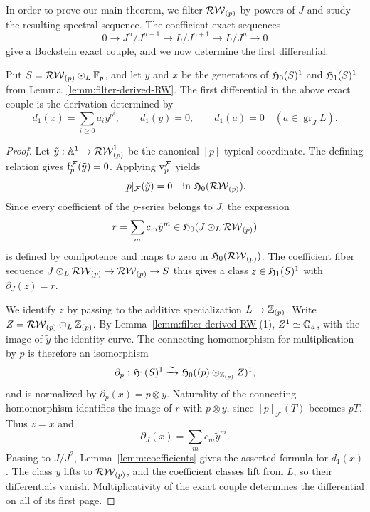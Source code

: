 In order to prove our main theorem, we filter $\mathcal{RW}_{(p)}$ by powers of $J$ and study the resulting spectral sequence.
The coefficient exact sequences \[0\to J^n/J^{n+1}\to L/J^{n+1}\to L/J^n\to0\] give a Bockstein exact couple, and we now determine the first differential.
\begin{lemma}\label{lemm:bockstein}
Put $S=\mathcal{RW}_{(p)}\odot_L \mathbb{F}_p$, and let $y$ and $x$ be the generators of $\mathfrak H_0(S)^1$ and $\mathfrak H_1(S)^1$ from Lemma~\ref{lemm:filter-derived-RW}. The first differential in the above exact couple is the derivation determined by
\[d_1(x)=\sum_{i\ge0}a_i y^{p^i},\qquad d_1(y)=0,\qquad d_1(a)=0\quad(a\in\operatorname{gr}_J L).\]
\end{lemma}
\begin{proof}
Let $\tilde y:\mathbb A^1\to \mathcal{RW}_{(p)}^1$ be the canonical $[p]$-typical coordinate. The defining relation gives $\mathrm f_p^{\mathcal F}(\tilde y)=0$. Applying $\mathrm v_p^{\mathcal F}$ yields
\[ [p]_{\mathcal F}(\tilde y)=0\quad\text{in }\mathfrak H_0(\mathcal{RW}_{(p)}). \]
Since every coefficient of the $p$-series belongs to $J$, the expression
\[r=\sum_m c_m\tilde y^m\in\mathfrak H_0(J\odot_L \mathcal{RW}_{(p)})\]
is defined by conilpotence and maps to zero in $\mathfrak H_0(\mathcal{RW}_{(p)})$. The coefficient fiber sequence $J\odot_L \mathcal{RW}_{(p)}\to \mathcal{RW}_{(p)}\to S$ thus gives a class $z\in\mathfrak H_1(S)^1$ with $\partial_J(z)=r$.

We identify $z$ by passing to the additive specialization $L\to\mathbb{Z}_{(p)}$. Write $Z=\mathcal{RW}_{(p)}\odot_L\mathbb{Z}_{(p)}$. By Lemma~\ref{lemm:filter-derived-RW}(1), $Z^1\simeq{\mathbb G}_a$, with the image of $\tilde y$ the identity curve. The connecting homomorphism for multiplication by $p$ is therefore an isomorphism
\[ \partial_p:\mathfrak H_1(S)^1\xrightarrow{\simeq}\mathfrak H_0((p)\odot_{\mathbb{Z}_{(p)}}Z)^1,\]
and is normalized by $\partial_p(x)=p\otimes y$. Naturality of the connecting homomorphism identifies the image of $r$ with $p\otimes y$, since $[p]_{\mathcal F}(T)$ becomes $pT$. Thus $z=x$ and
\[\partial_J(x)=\sum_m c_m\tilde y^m.\]
Passing to $J/J^2$, Lemma~\ref{lemm:coefficients} gives the asserted formula for $d_1(x)$. The class $y$ lifts to $\mathcal{RW}_{(p)}$, and the coefficient classes lift from $L$, so their differentials vanish. Multiplicativity of the exact couple determines the differential on all of its first page.
\end{proof}

